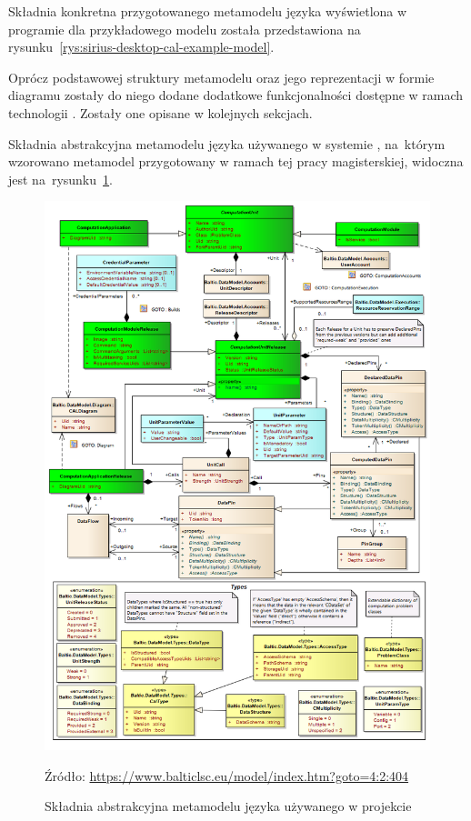 Składnia konkretna przygotowanego metamodelu języka \CAL{} wyświetlona w
programie \SiriusDesktop{} dla przykładowego modelu została przedstawiona na
rysunku~\ref{rys:sirius-desktop-cal-example-model}.

Oprócz podstawowej struktury metamodelu oraz jego reprezentacji w formie
diagramu zostały do niego dodane dodatkowe funkcjonalności dostępne w ramach
technologii \EMF{}. Zostały one opisane
w kolejnych sekcjach.

Składnia abstrakcyjna metamodelu języka \CAL{} używanego w systemie
\BalticLSC{}, na~którym wzorowano metamodel przygotowany w ramach tej pracy
magisterskiej, widoczna jest na~rysunku~\ref{rys:cal-metamodel-balticlsc}.

\begin{figure}[!ht]
	\centering


	\includegraphics[width=0.82\linewidth]{./images/cal-metamodel-balticlsc.png}
	\caption{Składnia abstrakcyjna metamodelu języka \CAL{} używanego w
		projekcie \BalticLSC{}}\label{rys:cal-metamodel-balticlsc}

	\medskip
	{\small Źródło:
		\url{https://www.balticlsc.eu/model/index.htm?goto=4:2:404}}
\end{figure}

